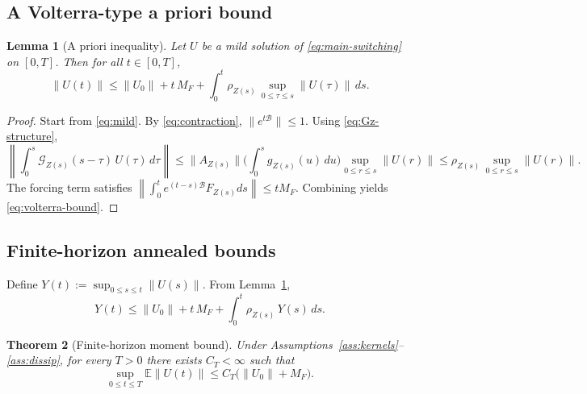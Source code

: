 \documentclass[12pt,a4paper]{article}
\theoremstyle{plain}
\newtheorem{theorem}{Theorem}[section]
\newtheorem{lemma}[theorem]{Lemma}
\theoremstyle{definition}
\theoremstyle{remark}
\begin{document}
\subsection{A Volterra-type a priori bound}
\label{subsec:volterra-ineq}

\begin{lemma}[A priori inequality]
	\label{lem:volterra-ineq}
	Let $U$ be a mild solution of \eqref{eq:main-switching} on $[0,T]$.
	Then for all $t\in[0,T]$,
	\begin{equation}
		\label{eq:volterra-bound}
		\|U(t)\|
		\le
		\|U_0\| + t\,M_F
		+\int_{0}^{t}\rho_{Z(s)}\,\sup_{0\le \tau\le s}\|U(\tau)\|\,ds.
	\end{equation}
\end{lemma}

\begin{proof}
	Start from \eqref{eq:mild}. By \eqref{eq:contraction}, $\|e^{t\mathcal B}\|\le 1$.
	Using \eqref{eq:Gz-structure},
	\[
	\left\|\int_{0}^{s}\mathcal G_{Z(s)}(s-\tau)\,U(\tau)\,d\tau\right\|
	\le
	\|A_{Z(s)}\|\Big(\int_0^{s} g_{Z(s)}(u)\,du\Big)\sup_{0\le r\le s}\|U(r)\|
	\le
	\rho_{Z(s)}\,\sup_{0\le r\le s}\|U(r)\|.
	\]
	The forcing term satisfies $\left\|\int_0^t e^{(t-s)\mathcal B}F_{Z(s)}ds\right\|\le tM_F$.
	Combining yields \eqref{eq:volterra-bound}.
\end{proof}

\subsection{Finite-horizon annealed bounds}
\label{subsec:annealed-bounds}

Define $Y(t):=\sup_{0\le s\le t}\|U(s)\|$.
From Lemma~\ref{lem:volterra-ineq},
\begin{equation}
	\label{eq:Y-ineq}
	Y(t)
	\le
	\|U_0\| + t\,M_F + \int_0^t \rho_{Z(s)}\,Y(s)\,ds.
\end{equation}

\begin{theorem}[Finite-horizon moment bound]
	\label{thm:annealed-finiteT}
	Under Assumptions~\ref{ass:kernels}--\ref{ass:dissip}, for every $T>0$ there exists
	$C_T<\infty$ such that
	\begin{equation}
		\label{eq:annealed-finiteT}
		\sup_{0\le t\le T}\mathbb E\|U(t)\|
		\le
		C_T\big(\|U_0\|+M_F\big).
	\end{equation}
\end{theorem}
\end{document}
